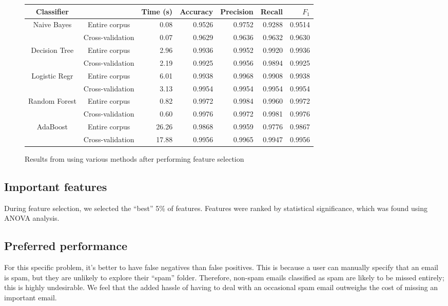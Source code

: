 \documentclass{article} %
\begin{document}
\begin{figure}[h]
  \begin{tabular}[h]{ | c | c | r | r | r | r | r | }
    \hline
    Classifier    &                  & Time (s) & Accuracy & Precision & Recall & $F_1$  \\ \hline
    Naive Bayes   & Entire corpus    & 0.08     & 0.9526   & 0.9752    & 0.9288 & 0.9514 \\ \cline{2-7}
                  & Cross-validation & 0.07     & 0.9629   & 0.9636    & 0.9632 & 0.9630 \\ \hline
    Decision Tree & Entire corpus    & 2.96     & 0.9936   & 0.9952    & 0.9920 & 0.9936 \\ \cline{2-7}
                  & Cross-validation & 2.19     & 0.9925   & 0.9956    & 0.9894 & 0.9925 \\ \hline
    Logistic Regr & Entire corpus    & 6.01     & 0.9938   & 0.9968    & 0.9908 & 0.9938 \\ \cline{2-7}
                  & Cross-validation & 3.13     & 0.9954   & 0.9954    & 0.9954 & 0.9954 \\ \hline
    Random Forest & Entire corpus    & 0.82     & 0.9972   & 0.9984    & 0.9960 & 0.9972 \\ \cline{2-7}
                  & Cross-validation & 0.60     & 0.9976   & 0.9972    & 0.9981 & 0.9976 \\ \hline
    AdaBoost      & Entire corpus    & 26.26    & 0.9868   & 0.9959    & 0.9776 & 0.9867 \\ \cline{2-7}
                  & Cross-validation & 17.88    & 0.9956   & 0.9965    & 0.9947 & 0.9956 \\ \hline
  \end{tabular}
  \caption{Results from using various methods after performing feature selection}
  \label{fig:table_selected}
\end{figure}

\subsection{Important features}
During feature selection, we selected the ``best'' 5\% of features. Features were ranked by statistical significance, which was found using ANOVA analysis. 

\subsection{Preferred performance}
For this specific problem, it's better to have false negatives than false positives. This is because a user can manually specify that an email is spam, but they are unlikely to explore their ``spam'' folder. Therefore, non-spam emails classified as spam are likely to be missed entirely; this is highly undesirable. We feel that the added hassle of having to deal with an occasional spam email outweighs the cost of missing an important email. 
\end{document}
